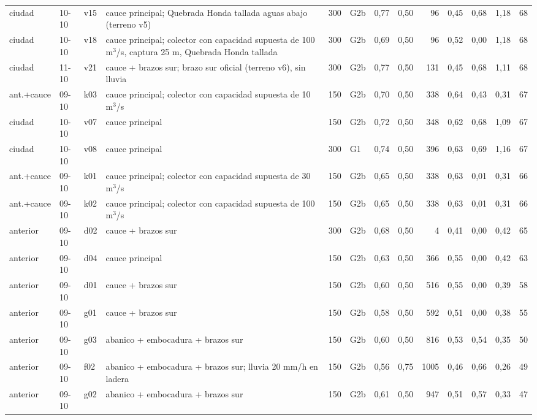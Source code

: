 {\begin{longtable}{lll>{\raggedright\arraybackslash}p{3.3cm}rlrrrrrrr}
ciudad & 10-10 & v15 & cauce principal; Quebrada Honda tallada aguas abajo (terreno v5) & 300 & G2b & 0{,}77 & 0{,}50 & 96 & 0{,}45 & 0{,}68 & 1{,}18 & 68\\
ciudad & 10-10 & v18 & cauce principal; colector con capacidad supuesta de 100 m$^3$/s, captura 25 m, Quebrada Honda tallada & 300 & G2b & 0{,}69 & 0{,}50 & 96 & 0{,}52 & 0{,}00 & 1{,}18 & 68\\
ciudad & 11-10 & v21 & cauce + brazos sur; brazo sur oficial (terreno v6), sin lluvia & 300 & G2b & 0{,}77 & 0{,}50 & 131 & 0{,}45 & 0{,}68 & 1{,}11 & 68\\
ant.+cauce & 09-10 & k03 & cauce principal; colector con capacidad supuesta de 10 m$^3$/s & 150 & G2b & 0{,}70 & 0{,}50 & 338 & 0{,}64 & 0{,}43 & 0{,}31 & 67\\
ciudad & 10-10 & v07 & cauce principal & 150 & G2b & 0{,}72 & 0{,}50 & 348 & 0{,}62 & 0{,}68 & 1{,}09 & 67\\
ciudad & 10-10 & v08 & cauce principal & 300 & G1 & 0{,}74 & 0{,}50 & 396 & 0{,}63 & 0{,}69 & 1{,}16 & 67\\
ant.+cauce & 09-10 & k01 & cauce principal; colector con capacidad supuesta de 30 m$^3$/s & 150 & G2b & 0{,}65 & 0{,}50 & 338 & 0{,}63 & 0{,}01 & 0{,}31 & 66\\
ant.+cauce & 09-10 & k02 & cauce principal; colector con capacidad supuesta de 100 m$^3$/s & 150 & G2b & 0{,}65 & 0{,}50 & 338 & 0{,}63 & 0{,}01 & 0{,}31 & 66\\
anterior & 09-10 & d02 & cauce + brazos sur & 300 & G2b & 0{,}68 & 0{,}50 & 4 & 0{,}41 & 0{,}00 & 0{,}42 & 65\\
anterior & 09-10 & d04 & cauce principal & 150 & G2b & 0{,}63 & 0{,}50 & 366 & 0{,}55 & 0{,}00 & 0{,}42 & 63\\
anterior & 09-10 & d01 & cauce + brazos sur & 150 & G2b & 0{,}60 & 0{,}50 & 516 & 0{,}55 & 0{,}00 & 0{,}39 & 58\\
anterior & 09-10 & g01 & cauce + brazos sur & 150 & G2b & 0{,}58 & 0{,}50 & 592 & 0{,}51 & 0{,}00 & 0{,}38 & 55\\
anterior & 09-10 & g03 & abanico + embocadura + brazos sur & 150 & G2b & 0{,}60 & 0{,}50 & 816 & 0{,}53 & 0{,}54 & 0{,}35 & 50\\
anterior & 09-10 & f02 & abanico + embocadura + brazos sur; lluvia 20 mm/h en ladera & 150 & G2b & 0{,}56 & 0{,}75 & 1005 & 0{,}46 & 0{,}66 & 0{,}26 & 49\\
anterior & 09-10 & g02 & abanico + embocadura + brazos sur & 150 & G2b & 0{,}61 & 0{,}50 & 947 & 0{,}51 & 0{,}57 & 0{,}33 & 47\\

\end{longtable}}
